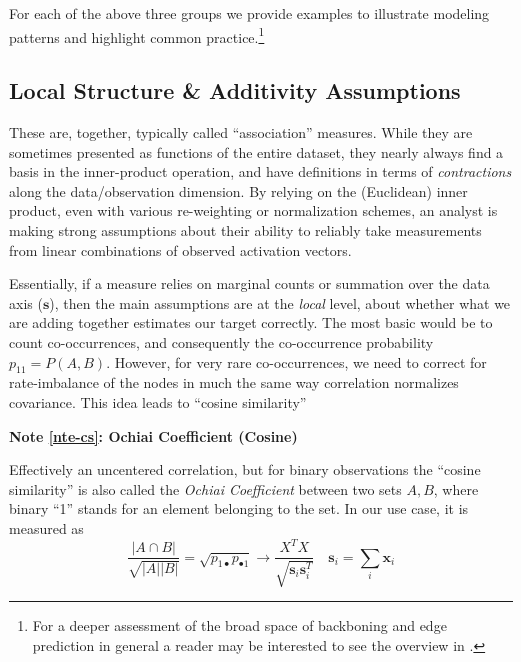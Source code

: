 \documentclass[%
	12pt,
		oneside,
		letterpaper
]{book}
\newcounter{quartocalloutnteno}
\newcommand{\quartocalloutnte}[1]{\refstepcounter{quartocalloutnteno}\label{#1}}
\begin{document}
For each of the above three groups we provide examples to illustrate
modeling patterns and highlight common practice.\footnote{ For a deeper
  assessment of the broad space of backboning and edge prediction in
  general a reader may be interested to see the overview in
  \textcite{atlasaspiringnetwork_Coscia2021}.}

\subsection{Local Structure \& Additivity
Assumptions}\label{local-structure-additivity-assumptions}

These are, together, typically called ``association'' measures. While
they are sometimes presented as functions of the entire dataset, they
nearly always find a basis in the inner-product operation, and have
definitions in terms of \emph{contractions} along the data/observation
dimension. By relying on the (Euclidean) inner product, even with
various re-weighting or normalization schemes, an analyst is making
strong assumptions about their ability to reliably take measurements
from linear combinations of observed activation vectors.

Essentially, if a measure relies on marginal counts or summation over
the data axis (\(\mathbf{s}\)), then the main assumptions are at the
\emph{local} level, about whether what we are adding together estimates
our target correctly. The most basic would be to count co-occurrences,
and consequently the co-occurrence probability \(p_{11}=P(A,B)\).
However, for very rare co-occurrences, we need to correct for
rate-imbalance of the nodes in much the same way correlation normalizes
covariance. This idea leads to ``cosine similarity''

\begin{tcolorbox}[enhanced jigsaw, opacityback=0, colframe=quarto-callout-note-color-frame, arc=.35mm, leftrule=.75mm, breakable, bottomrule=.15mm, left=2mm, colback=white, toprule=.15mm, rightrule=.15mm]

\quartocalloutnte{nte-cs} 

\vspace{-3mm}\textbf{Note \ref*{nte-cs}: Ochiai Coefficient (Cosine)}\vspace{3mm}

Effectively an uncentered correlation, but for binary observations the
``cosine similarity'' is also called the \emph{Ochiai Coefficient}
between two sets \(A,B\), where binary ``1'' stands for an element
belonging to the set.\autocite{Measuresecologicalassociation_Janson1981}
In our use case, it is measured as \[
\frac{|A \cap B |}{\sqrt{|A||B|}}=\sqrt{p_{1\bullet}p_{\bullet 1}} \rightarrow  \frac{X^TX}{\sqrt{\mathbf{s}_i\mathbf{s}_i^T}}\quad \mathbf{s}_i = \sum_i \mathbf{x}_i
\]

\end{tcolorbox}
\end{document}
